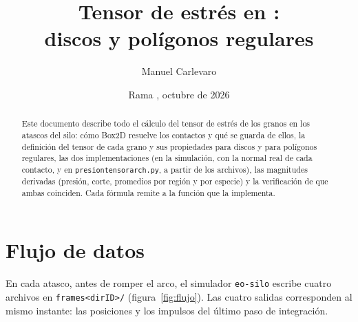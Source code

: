 \documentclass[11pt,a4paper]{article}
\title{Tensor de estrés en \code{sim-binary-shapes-2d}:\\
  discos y polígonos regulares}
\author{Manuel Carlevaro}
\date{Rama \code{tensor-en-simulacion}, octubre de 2026}
\newcommand{\codeus}{\textunderscore\allowbreak}
\newcommand{\code}[1]{\texttt{\begingroup\let\_\codeus#1\endgroup}}
\begin{document}
\maketitle

\begin{abstract}
  Este documento describe todo el cálculo del tensor de estrés de los
  granos en los atascos del silo: cómo Box2D resuelve los contactos y qué
  se guarda de ellos, la definición del tensor de cada grano y sus
  propiedades para discos y para polígonos regulares, las dos
  implementaciones (en la simulación, con la normal real de cada contacto,
  y en \code{presion\_tensor\_arch.py}, a partir de los archivos), las
  magnitudes derivadas (presión, corte, promedios por región y por
  especie) y la verificación de que ambas coinciden. Cada fórmula remite a
  la función que la implementa.
\end{abstract}

\tableofcontents

\section{Flujo de datos}
\label{sec:flujo}

En cada atasco, antes de romper el arco, el simulador \code{eo-silo}
escribe cuatro archivos en \code{frames\_<dirID>/}
(figura~\ref{fig:flujo}). Las cuatro salidas corresponden al mismo
instante: las posiciones y los impulsos del último paso de integración.
\end{document}
